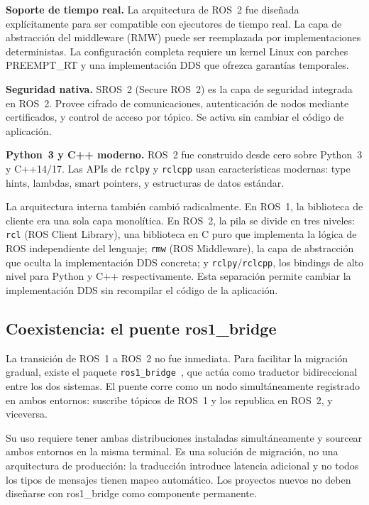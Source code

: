 \textbf{Soporte de tiempo real.} La arquitectura de ROS~2 fue diseñada explícitamente para ser compatible con ejecutores de tiempo real. La capa de abstracción del middleware (RMW) puede ser reemplazada por implementaciones deterministas. La configuración completa requiere un kernel Linux con parches PREEMPT\_RT y una implementación DDS que ofrezca garantías temporales.

\textbf{Seguridad nativa.} SROS~2 (Secure ROS~2) es la capa de seguridad integrada en ROS~2. Provee cifrado de comunicaciones, autenticación de nodos mediante certificados, y control de acceso por tópico. Se activa sin cambiar el código de aplicación.

\textbf{Python~3 y C++ moderno.} ROS~2 fue construido desde cero sobre Python~3 y C++14/17. Las APIs de \texttt{rclpy} y \texttt{rclcpp} usan características modernas: type hints, lambdas, smart pointers, y estructuras de datos estándar.

La arquitectura interna también cambió radicalmente. En ROS~1, la biblioteca de cliente era una sola capa monolítica. En ROS~2, la pila se divide en tres niveles: \texttt{rcl} (ROS Client Library), una biblioteca en C puro que implementa la lógica de ROS independiente del lenguaje; \texttt{rmw} (ROS Middleware), la capa de abstracción que oculta la implementación DDS concreta; y \texttt{rclpy}/\texttt{rclcpp}, los bindings de alto nivel para Python y C++ respectivamente. Esta separación permite cambiar la implementación DDS sin recompilar el código de la aplicación.

\subsection{Coexistencia: el puente ros1\_bridge}

La transición de ROS~1 a ROS~2 no fue inmediata. Para facilitar la migración gradual, existe el paquete \texttt{ros1\_bridge}~\cite{ros1bridge}, que actúa como traductor bidireccional entre los dos sistemas. El puente corre como un nodo simultáneamente registrado en ambos entornos: suscribe tópicos de ROS~1 y los republica en ROS~2, y viceversa.

Su uso requiere tener ambas distribuciones instaladas simultáneamente y sourcear ambos entornos en la misma terminal. Es una solución de migración, no una arquitectura de producción: la traducción introduce latencia adicional y no todos los tipos de mensajes tienen mapeo automático. Los proyectos nuevos no deben diseñarse con ros1\_bridge como componente permanente.
